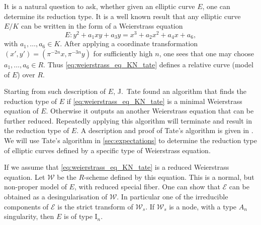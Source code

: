 It is a natural question to ask, whether given an elliptic curve $E$, one can determine its reduction type. 
It is a well known result that any elliptic curve $E / K$ can be written in the form of a Weierstrass equation \begin{equation}\label{eq:weierstrass_eq_KN_tate}
E: y^2 +a_1 xy + a_3 y= x^3 + a_2 x^2 + a_4 x + a_6
,\end{equation}
with $a_1, \ldots, a_6 \in K$. 
After applying a coordinate transformation $(x', y') = (\pi^{-2n}x, \pi^{-3n} y)$ for sufficiently high $n$, one sees that one may choose  $a_1, \ldots, a_6 \in R$.
Thus \eqref{eq:weierstrass_eq_KN_tate} defines a relative curve (model of $E$) over  $R$. 

Starting from such description of $E$, J.\ Tate found an algorithm that finds the reduction type of $E$ if \eqref{eq:weierstrass_eq_KN_tate} is a minimal Weierstrass equation of  $E$. 
Otherwise it outputs an another Weierstrass equation that can be further reduced. 
Repeatedly applying this algorithm will terminate and result in the reduction type of $E$. 
A description and proof of Tate's algorithm is given in \cite[sec.\ IV.9]{silvermanAdvancedTopicsArithmetic1994}.
We will use Tate's algorithm in \cref{sec:expectations} to determine the reduction type of elliptic curves defined by a specific type of Weierstrass equation.

\medskip

If we assume that \eqref{eq:weierstrass_eq_KN_tate} is a reduced Weierstrass equation. 
Let $\mathscr W $ be the $R$-scheme defined by this equation. 
This is a normal, but non-proper model of $E$, with reduced special fiber. 
One can show that $\mathscr E$ can be obtained as a desingularisation of $\mathscr W$. 
In particular one of the irreducible components of $\mathscr E$ is the strict transform of $\mathscr W_s$. 
If $\mathscr W_s$ is a node, with a type $A_n$ singularity, then $E$ is of type $\mathrm I_n$. 
